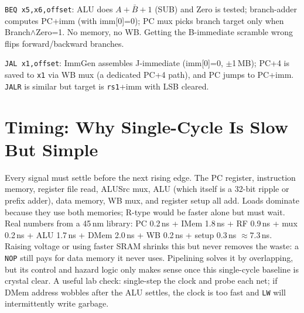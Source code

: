 \texttt{BEQ x5,x6,offset}: ALU does $A+\bar{B}+1$ (SUB) and Zero is tested; branch-adder computes PC+imm (with imm[0]=0); PC mux picks branch target only when Branch$\land$Zero=1. No memory, no WB. Getting the B-immediate scramble wrong flips forward/backward branches.

\texttt{JAL x1,offset}: ImmGen assembles J-immediate (imm[0]=0, $\pm$1\,MB); PC+4 is saved to \texttt{x1} via WB mux (a dedicated PC+4 path), and PC jumps to PC+imm. \texttt{JALR} is similar but target is \texttt{rs1}+imm with LSB cleared.

\begin{center}
\end{center}

\section{Timing: Why Single-Cycle Is Slow But Simple}
Every signal must settle before the next rising edge. The PC register, instruction memory, register file read, ALUSrc mux, ALU (which itself is a 32-bit ripple or prefix adder), data memory, WB mux, and register setup all add. Loads dominate because they use both memories; R-type would be faster alone but must wait. Real numbers from a 45\,nm library: PC 0.2\,ns + IMem 1.8\,ns + RF 0.9\,ns + mux 0.2\,ns + ALU 1.7\,ns + DMem 2.0\,ns + WB 0.2\,ns + setup 0.3\,ns $\approx 7.3$\,ns. Raising voltage or using faster SRAM shrinks this but never removes the waste: a \texttt{NOP} still pays for data memory it never uses. Pipelining solves it by overlapping, but its control and hazard logic only makes sense once this single-cycle baseline is crystal clear. A useful lab check: single-step the clock and probe each net; if DMem address wobbles after the ALU settles, the clock is too fast and \texttt{LW} will intermittently write garbage.


